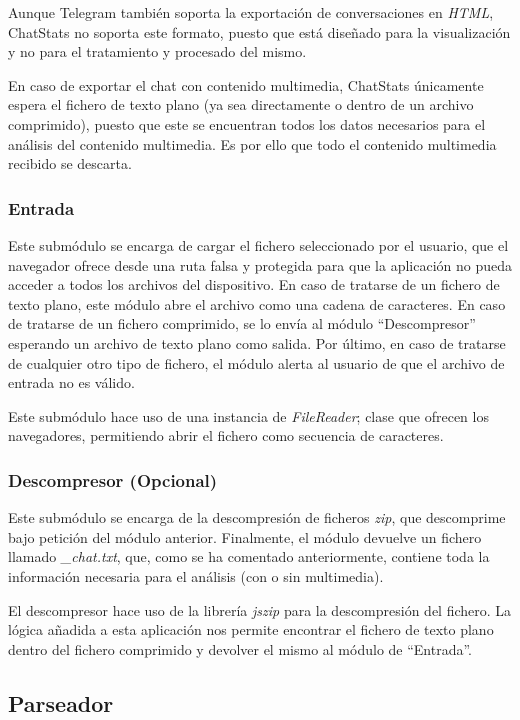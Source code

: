 Aunque Telegram también soporta la exportación de conversaciones en \textit{HTML}, ChatStats no soporta este formato, puesto que está diseñado para la visualización y no para el tratamiento y procesado del mismo.

En caso de exportar el chat con contenido multimedia, ChatStats únicamente espera el fichero de texto plano (ya sea directamente o dentro de un archivo comprimido), puesto que este se encuentran todos los datos necesarios para el análisis del contenido multimedia. Es por ello que todo el contenido multimedia recibido se descarta.

\subsubsection{Entrada}

Este submódulo se encarga de cargar el fichero seleccionado por el usuario, que el navegador ofrece desde una ruta falsa y protegida para que la aplicación no pueda acceder a todos los archivos del dispositivo. En caso de tratarse de un fichero de texto plano, este módulo abre el archivo como una cadena de caracteres. En caso de tratarse de un fichero comprimido, se lo envía al módulo ``Descompresor'' esperando un archivo de texto plano como salida. Por último, en caso de tratarse de cualquier otro tipo de fichero, el módulo alerta al usuario de que el archivo de entrada no es válido.

Este submódulo hace uso de una instancia de \textit{FileReader}; clase que ofrecen los navegadores, permitiendo abrir el fichero como secuencia de caracteres.

\subsubsection{Descompresor (Opcional)}

Este submódulo se encarga de la descompresión de ficheros \textit{zip}, que descomprime bajo petición del módulo anterior. Finalmente, el módulo devuelve un fichero llamado \textit{\_chat.txt}, que, como se ha comentado anteriormente, contiene toda la información necesaria para el análisis (con o sin multimedia).

El descompresor hace uso de la librería \textit{jszip} para la descompresión del fichero. La lógica añadida a esta aplicación nos permite encontrar el fichero de texto plano dentro del fichero comprimido y devolver el mismo al módulo de ``Entrada''.

\subsection{Parseador}

